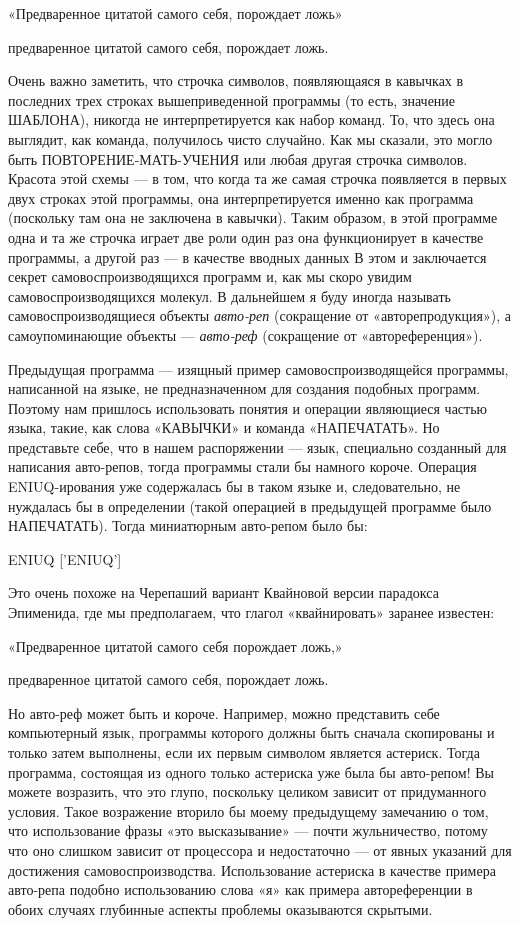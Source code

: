 \documentclass[../main.tex]{subfiles}
\begin{document}
«Предваренное цитатой самого себя, порождает ложь»

предваренное цитатой самого себя, порождает ложь.

Очень важно заметить, что строчка символов, появляющаяся в кавычках в последних трех строках вышеприведенной программы (то есть, значение ШАБЛОНА), никогда не интерпретируется как набор команд. То, что здесь она выглядит, как команда, получилось чисто случайно. Как мы сказали, это могло быть ПОВТОРЕНИЕ-МАТЬ-УЧЕНИЯ или любая другая строчка символов. Красота этой схемы --- в том, что когда та же самая строчка появляется в первых двух строках этой программы, она интерпретируется именно как программа (поскольку там она не заключена в кавычки). Таким образом, в этой программе одна и та же строчка играет две роли один раз она функционирует в качестве программы, а другой раз --- в качестве вводных данных В этом и заключается секрет самовоспроизводящихся программ и, как мы скоро увидим самовоспроизводящихся молекул. В дальнейшем я буду иногда называть самовоспроизводящиеся объекты \emph{авто-реп} (сокращение от «авторепродукция»), а самоупоминающие объекты --- \emph{авто-реф} (сокращение от «автореференция»).

Предыдущая программа --- изящный пример самовоспроизводящейся программы, написанной на языке, не предназначенном для создания подобных программ. Поэтому нам пришлось использовать понятия и операции являющиеся частью языка, такие, как слова «КАВЫЧКИ» и команда «НАПЕЧАТАТЬ». Но представьте себе, что в нашем распоряжении --- язык, специально созданный для написания авто-репов, тогда программы стали бы намного короче. Операция ENIUQ-ирования уже содержалась бы в таком языке и, следовательно, не нуждалась бы в определении (такой операцией в предыдущей программе было НАПЕЧАТАТЬ). Тогда миниатюрным авто-репом было бы:

ENIUQ {[}'ENIUQ'{]}

Это очень похоже на Черепаший вариант Квайновой версии парадокса Эпименида, где мы предполагаем, что глагол «квайнировать» заранее известен:

«Предваренное цитатой самого себя порождает ложь,»

предваренное цитатой самого себя, порождает ложь.

Но авто-реф может быть и короче. Например, можно представить себе компьютерный язык, программы которого должны быть сначала скопированы и только затем выполнены, если их первым символом является астериск. Тогда программа, состоящая из одного только астериска уже была бы авто-репом! Вы можете возразить, что это глупо, поскольку целиком зависит от придуманного условия. Такое возражение вторило бы моему предыдущему замечанию о том, что использование фразы «это высказывание» --- почти жульничество, потому что оно слишком зависит от процессора и недостаточно --- от явных указаний для достижения самовоспроизводства. Использование астериска в качестве примера авто-репа подобно использованию слова «я» как примера автореференции в обоих случаях глубинные аспекты проблемы оказываются скрытыми.
\end{document}
